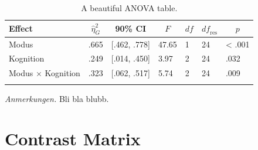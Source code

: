 \documentclass[
  doc,floatsintext]{apa6}
\newenvironment{Shaded}{\begin{snugshade}}{\end{snugshade}}
\newcommand{\DecValTok}[1]{\textcolor[rgb]{0.00,0.00,0.81}{#1}}
\newcommand{\FunctionTok}[1]{\textcolor[rgb]{0.13,0.29,0.53}{\textbf{#1}}}
\newcommand{\NormalTok}[1]{#1}
\newcommand{\OtherTok}[1]{\textcolor[rgb]{0.56,0.35,0.01}{#1}}
\newcommand{\SpecialCharTok}[1]{\textcolor[rgb]{0.81,0.36,0.00}{\textbf{#1}}}
\begin{document}
\begin{table}[tbp]

\begin{center}
\begin{threeparttable}

\caption{\label{tab:tabanova}A beautiful ANOVA table.}

\begin{tabular}{lllllll}
\toprule
Effect & \multicolumn{1}{c}{$\hat{\eta}^2_G$} & \multicolumn{1}{c}{90\% CI} & \multicolumn{1}{c}{$F$} & \multicolumn{1}{c}{$\mathit{df}$} & \multicolumn{1}{c}{$\mathit{df}_{\mathrm{res}}$} & \multicolumn{1}{c}{$p$}\\
\midrule
Modus & .665 & {}[.462, .778] & 47.65 & 1 & 24 & < .001\\
Kognition & .249 & {}[.014, .450] & 3.97 & 2 & 24 & .032\\
Modus $\times$ Kognition & .323 & {}[.062, .517] & 5.74 & 2 & 24 & .009\\
\bottomrule
\addlinespace
\end{tabular}

\begin{tablenotes}[para]
\normalsize{\textit{Anmerkungen.} Bli bla blubb.}
\end{tablenotes}

\end{threeparttable}
\end{center}

\end{table}

\hypertarget{contrast-matrix}{%
\section{Contrast Matrix}\label{contrast-matrix}}

\begin{Shaded}
\end{Shaded}
\end{document}
